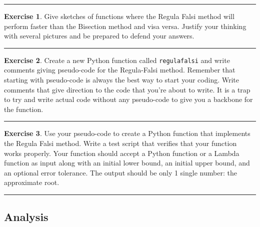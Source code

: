 \documentclass[
]{book}
\theoremstyle{definition}
\theoremstyle{definition}
\theoremstyle{definition}
\newtheorem{exercise}{Exercise}[chapter]
\theoremstyle{remark}
\begin{document}
\begin{center}\rule{0.5\linewidth}{0.5pt}\end{center}

\begin{exercise}
\protect\hypertarget{exr:unnamed-chunk-93}{}{\label{exr:unnamed-chunk-93} }Give sketches of functions where the Regula Falsi method will perform
faster than the Bisection method and visa versa. Justify your thinking
with several pictures and be prepared to defend your answers.
\end{exercise}

\begin{center}\rule{0.5\linewidth}{0.5pt}\end{center}

\begin{exercise}
\protect\hypertarget{exr:regulafalsi-python}{}{\label{exr:regulafalsi-python} }Create a new Python function called \texttt{regulafalsi} and write comments giving pseudo-code for
the Regula-Falsi method. Remember that starting with pseudo-code is always the best way to start your coding. Write comments that give direction to the code that you're about to write. It is a trap to try and write actual code without any pseudo-code to give you a backbone for the function.
\end{exercise}

\begin{center}\rule{0.5\linewidth}{0.5pt}\end{center}

\begin{exercise}
\protect\hypertarget{exr:unnamed-chunk-94}{}{\label{exr:unnamed-chunk-94} }Use your pseudo-code to create a Python function that implements the Regula
Falsi method. Write a test script that verifies that your function
works properly. Your function should accept a Python function or a Lambda function as input along with
an initial lower bound, an
initial upper bound, and an optional error tolerance. The output should
be only 1 single number: the approximate root.
\end{exercise}

\begin{center}\rule{0.5\linewidth}{0.5pt}\end{center}

\hypertarget{analysis-1}{%
\subsection{Analysis}\label{analysis-1}}
\end{document}
